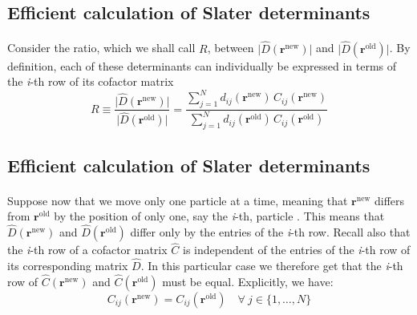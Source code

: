 \documentclass[%
twoside,                 %
final,                   %
10pt]{article}
\begin{document}
\subsection*{Efficient calculation of Slater determinants}

\paragraph{}
Consider the ratio, which we shall call $R$, between $\vert\hat{D}(\mathbf{r}^{\mathrm{new}})\vert$ and $\vert\hat{D}(\mathbf{r}^{\mathrm{old}})\vert$. 
By definition, each of these determinants can
individually be expressed in terms of the \emph{i}-th row of its cofactor
matrix
\begin{equation}
R\equiv\frac{\vert\hat{D}(\mathbf{r}^{\mathrm{new}})\vert}
{\vert\hat{D}(\mathbf{r}^{\mathrm{old}})\vert} =
\frac{\sum_{j=1}^N d_{ij}(\mathbf{r}^{\mathrm{new}})\,
C_{ij}(\mathbf{r}^{\mathrm{new}})}
{\sum_{j=1}^N d_{ij}(\mathbf{r}^{\mathrm{old}})\,
C_{ij}(\mathbf{r}^{\mathrm{old}})}
\label{eq:detratio_cofactors}
\end{equation}




\subsection*{Efficient calculation of Slater determinants}

\paragraph{}
Suppose now that we move only one particle  at a time, meaning that
$\mathbf{r}^{\mathrm{new}}$ differs from $\mathbf{r}^{\mathrm{old}}$ by the
position of only one, say the \emph{i}-th, particle . This means that $\hat{D}(\mathbf{r}^{\mathrm{new}})$ and $\hat{D}(\mathbf{r}^{\mathrm{old}})$ differ
only by the entries of the \emph{i}-th row.  Recall also that the \emph{i}-th row
of a cofactor matrix $\hat{C}$ is independent of the entries of the
\emph{i}-th row of its corresponding matrix $\hat{D}$. In this particular
case we therefore get that the \emph{i}-th row of $\hat{C}(\mathbf{r}^{\mathrm{new}})$ 
and $\hat{C}(\mathbf{r}^{\mathrm{old}})$ must be
equal. Explicitly, we have:
\begin{equation}
C_{ij}(\mathbf{r}^{\mathrm{new}}) = C_{ij}(\mathbf{r}^{\mathrm{old}})\quad
\forall\ j\in\{1,\dots,N\}
\end{equation}
\end{document}
